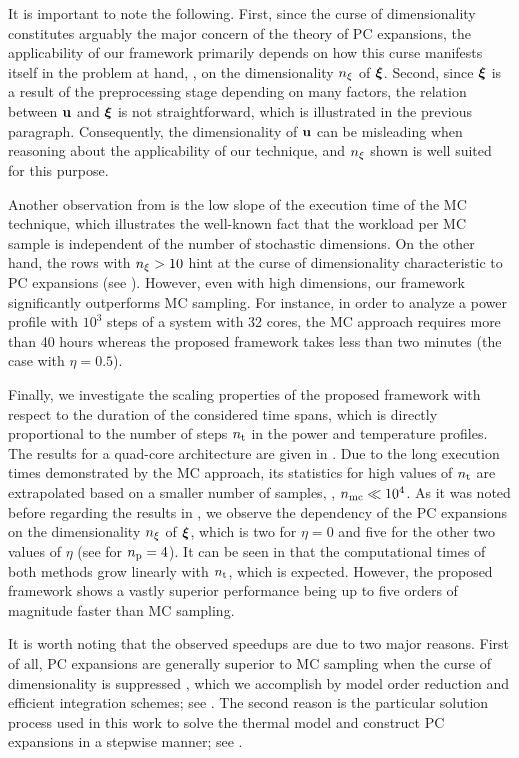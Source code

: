It is important to note the following.
First, since the curse of dimensionality constitutes arguably the major concern of the theory of PC expansions, the applicability of our framework primarily depends on how this curse manifests itself in the problem at hand, \ie, on the dimensionality ${n_\xi}$ of $\boldsymbol{\xi}$.
Second, since $\boldsymbol{\xi}$ is a result of the preprocessing stage depending on many factors, the relation between $\mathbf{u}$ and $\boldsymbol{\xi}$ is not straightforward, which is illustrated in the previous paragraph.
Consequently, the dimensionality of $\mathbf{u}$ can be misleading when reasoning about the applicability of our technique, and ${n_\xi}$ shown  is well suited for this purpose.

Another observation from  is the low slope of the execution time of the MC technique, which illustrates the well-known fact that the workload per MC sample is independent of the number of stochastic dimensions.
On the other hand, the rows with ${n_\xi} > 10$ hint at the curse of dimensionality characteristic to PC expansions (see ).
However, even with high dimensions, our framework significantly outperforms MC sampling. For instance, in order to analyze a power profile with $10^3$ steps of a system with 32 cores, the MC approach requires more than 40 hours whereas the proposed framework takes less than two minutes (the case with $\eta = 0.5$).

Finally, we investigate the scaling properties of the proposed framework with respect to the duration of the considered time spans, which is directly proportional to the number of steps ${n_\text{t}}$ in the power and temperature profiles.
The results for a quad-core architecture are given in .
Due to the long execution times demonstrated by the MC approach, its statistics for high values of ${n_\text{t}}$ are extrapolated based on a smaller number of samples, \ie, ${n_\text{mc}} \ll 10^4$.
As it was noted before regarding the results in , we observe the dependency of the PC expansions on the dimensionality ${n_\xi}$ of $\boldsymbol{\xi}$, which is two for $\eta = 0$ and five for the other two values of $\eta$ (see  for ${n_\text{p}} = 4$).
It can be seen in  that the computational times of both methods grow linearly with ${n_\text{t}}$, which is expected.
However, the proposed framework shows a vastly superior performance being up to five orders of magnitude faster than MC sampling.

It is worth noting that the observed speedups are due to two major reasons.
First of all, PC expansions are generally superior to MC sampling when the curse of dimensionality is suppressed \cite{xiu2010, eldred2008}, which we accomplish by model order reduction and efficient integration schemes; see .
The second reason is the particular solution process used in this work to solve the thermal model and construct PC expansions in a stepwise manner; see .
